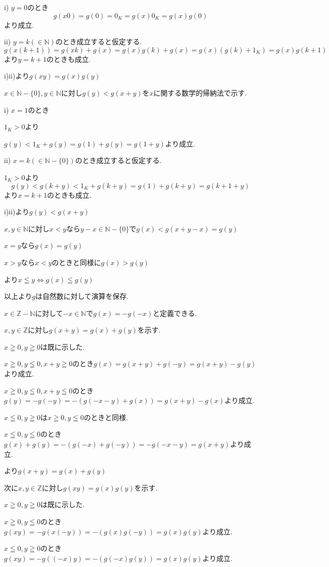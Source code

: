 \documentclass{jsarticle}
\begin{document}
i) $y=0$のとき
\[g(x0)=g(0)=0_K=g(x)0_K=g(x)g(0)\]
より成立.

ii) $y=k(\in\mathbb{N})$のとき成立すると仮定する.
\[g(x(k+1))=g(xk)+g(x)=g(x)g(k)+g(x)=g(x)(g(k)+1_K)=g(x)g(k+1)\]
より$y=k+1$のときも成立.

i)ii)より$g(xy)=g(x)g(y)$

$x\in\mathbb{N}-\{0\},y\in\mathbb{N}$に対し$g(y)< g(x+y)$を$x$に関する数学的帰納法で示す.

i) $x=1$のとき

$1_K > 0$より

$g(y)<1_K+g(y)=g(1)+g(y)=g(1+y)$より成立.

ii) $x=k(\in\mathbb{N}-\{0\})$のとき成立すると仮定する.

$1_K > 0$より
\[g(y) < g(k+y) < 1_K + g(k+y) = g(1) + g(k+y)  = g(k+1+y)\]
より$x=k+1$のときも成立.

i)ii)より$g(y) < g(x+y)$

$x,y\in\mathbb{N}$に対し$x < y$なら$y-x\in\mathbb{N}-\{0\}$で$g(x) < g(x+y-x) = g(y)$

$x=y$なら$g(x)=g(y)$

$x>y$なら$x<y$のときと同様に$g(x)>g(y)$

より$x\leqq y \Leftrightarrow g(x)\leqq g(y)$

以上より$g$は自然数に対して演算を保存.

$x\in \mathbb{Z}-\mathbb{N}$に対して$-x\in \mathbb{N}$で$g(x)=-g(-x)$と定義できる.

$x,y\in\mathbb{Z}$に対し$g(x+y)=g(x)+g(y)$を示す.

$x\geqq 0,y\geqq 0$は既に示した.

$x\geqq 0,y\leqq 0,x+y\geqq 0$のとき$g(x)=g(x+y)+g(-y)=g(x+y)-g(y)$より成立.

$x\geqq 0,y\leqq 0,x+y\leqq 0$のとき$g(y)=-g(-y)=-(g(-x-y)+g(x))=g(x+y)-g(x)$より成立.

$x\leqq 0,y\geqq 0$は$x\geqq 0,y\leqq 0$のときと同様.

$x\leqq 0,y\leqq 0$のとき$g(x)+g(y)=-(g(-x)+g(-y))=-g(-x-y)=g(x+y)$より成立.

より$g(x+y)=g(x)+g(y)$

次に$x,y\in\mathbb{Z}$に対し$g(xy)=g(x)g(y)$を示す.

$x\geqq 0,y\geqq 0$は既に示した.

$x\geqq 0,y\leqq 0$のとき$g(xy) = -g(x(-y))=-(g(x)g(-y))=g(x)g(y)$より成立.

$x\leqq 0,y\geqq 0$のとき$g(xy) = -g((-x)y)=-(g(-x)g(y))=g(x)g(y)$より成立.
\end{document}
